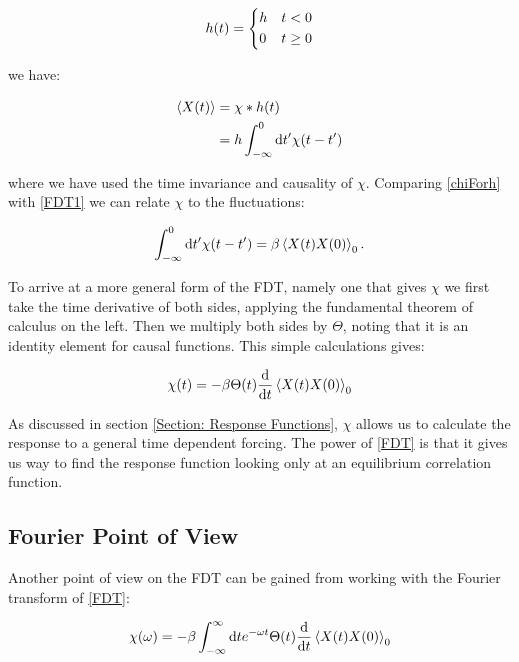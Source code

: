 \begin{align}
h(t) = 
\begin{dcases}
h & t<0 \\
0 & t \geq 0
\end{dcases}
\end{align}

\noindent we have: 

\begin{align}
\expval{X(t)} &= \chi * h(t) \\
&= h \int_{-\infty}^0 \dd t' \chi(t - t') \label{chiForh}
\end{align}

\noindent where we have used the time invariance and causality of $\chi$. Comparing \ref{chiForh} with \ref{FDT1} we can relate $\chi$ to the fluctuations:

\begin{align}
 \int_{-\infty}^0 \dd t' \chi(t - t') = \beta \expval{X(t)X(0)}_0 .
\end{align}

\noindent To arrive at a more general form of the FDT, namely one that gives $\chi$ we first take the time derivative of both sides, applying the fundamental theorem of calculus on the left. Then we multiply both sides by $\Theta$, noting that it is an identity element for causal functions. This simple calculations gives:

\begin{align}
\chi(t) = - \beta \Theta (t) \dv{t}\expval{X(t)X(0)}_0  \label{FDT}
\end{align}

\noindent As discussed in section \ref{Section: Response Functions}, $\chi$ allows us to calculate the response to a general time dependent forcing. The power of \ref{FDT} is that it gives us way to find the response function looking only at an equilibrium correlation function.

\subsection{Fourier Point of View}

Another point of view on the FDT can be gained from working with the Fourier transform of \ref{FDT}: 

\begin{align}
\chi(\omega) = - \beta \int_{-\infty}^{\infty} \dd t  e^{-\omega t} \Theta(t) \dv{t}\expval{X(t)X(0)}_0
\end{align}

